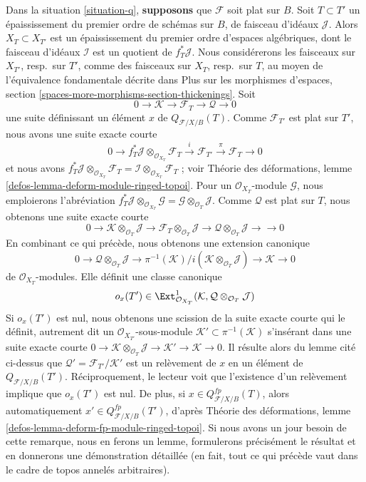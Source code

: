 \begin{remark}
\label{remark-q-obs}
Dans la situation \ref{situation-q}, {\bf supposons} que $\mathcal{F}$ soit
plat sur $B$. Soit $T \subset T'$ un épaississement du premier ordre de
schémas sur $B$, de faisceau d'idéaux $\mathcal{J}$. Alors
$X_T \subset X_{T'}$ est un épaississement du premier ordre d'espaces
algébriques, dont le faisceau d'idéaux $\mathcal{I}$ est un quotient de
$f_T^*\mathcal{J}$. Nous considérerons les faisceaux sur $X_{T'}$, resp.\ sur
$T'$, comme des faisceaux sur $X_T$, resp.\ sur $T$, au moyen de l'équivalence
fondamentale décrite dans Plus sur les morphismes d'espaces, section
\ref{spaces-more-morphisms-section-thickenings}. Soit
$$
0 \to \mathcal{K} \to \mathcal{F}_T \to \mathcal{Q} \to 0
$$
une suite définissant un élément $x$ de $Q_{\mathcal{F}/X/B}(T)$. Comme
$\mathcal{F}_{T'}$ est plat sur $T'$, nous avons une suite exacte courte
$$
0 \to f_T^*\mathcal{J} \otimes_{\mathcal{O}_{X_T}} \mathcal{F}_T
\xrightarrow{i} \mathcal{F}_{T'} \xrightarrow{\pi} \mathcal{F}_T \to 0
$$
et nous avons
$f_T^*\mathcal{J} \otimes_{\mathcal{O}_{X_T}} \mathcal{F}_T =
\mathcal{I} \otimes_{\mathcal{O}_{X_T}} \mathcal{F}_T$ ; voir Théorie des
déformations, lemme \ref{defos-lemma-deform-module-ringed-topoi}. Pour un
$\mathcal{O}_{X_T}$-module $\mathcal{G}$, nous emploierons l'abréviation
$
f_T^*\mathcal{J} \otimes_{\mathcal{O}_{X_T}} \mathcal{G} =
\mathcal{G} \otimes_{\mathcal{O}_T} \mathcal{J}
$.
Comme $\mathcal{Q}$ est plat sur $T$, nous obtenons une suite exacte courte
$$
0 \to
\mathcal{K} \otimes_{\mathcal{O}_T} \mathcal{J} \to
\mathcal{F}_T \otimes_{\mathcal{O}_T} \mathcal{J} \to
\mathcal{Q} \otimes_{\mathcal{O}_T} \mathcal{J} \to
\to 0
$$
En combinant ce qui précède, nous obtenons une extension canonique
$$
0 \to \mathcal{Q} \otimes_{\mathcal{O}_T} \mathcal{J} \to
\pi^{-1}(\mathcal{K})/i(\mathcal{K} \otimes_{\mathcal{O}_T} \mathcal{J}) \to
\mathcal{K} \to 0
$$
de $\mathcal{O}_{X_T}$-modules. Elle définit une classe canonique
$$
o_x(T') \in
\Ext^1_{\mathcal{O}_{X_T}}(\mathcal{K},
\mathcal{Q} \otimes_{\mathcal{O}_T} \mathcal{J})
$$
Si $o_x(T')$ est nul, nous obtenons une scission de la suite exacte courte qui
le définit, autrement dit un $\mathcal{O}_{X_{T'}}$-sous-module
$\mathcal{K}' \subset \pi^{-1}(\mathcal{K})$ s'insérant dans une suite exacte
courte
$0 \to \mathcal{K} \otimes_{\mathcal{O}_T} \mathcal{J} \to
\mathcal{K}' \to \mathcal{K} \to 0$. Il résulte alors du lemme cité ci-dessus
que $\mathcal{Q}' = \mathcal{F}_{T'}/\mathcal{K}'$ est un relèvement de $x$
en un élément de $Q_{\mathcal{F}/X/B}(T')$. Réciproquement, le lecteur voit
que l'existence d'un relèvement implique que $o_x(T')$ est nul. De plus, si
$x \in Q_{\mathcal{F}/X/B}^{fp}(T)$, alors automatiquement
$x' \in Q_{\mathcal{F}/X/B}^{fp}(T')$, d'après Théorie des déformations,
lemme \ref{defos-lemma-deform-fp-module-ringed-topoi}. Si nous avons un jour
besoin de cette remarque, nous en ferons un lemme, formulerons précisément le
résultat et en donnerons une démonstration détaillée (en fait, tout ce qui
précède vaut dans le cadre de topos annelés arbitraires).
\end{remark}

